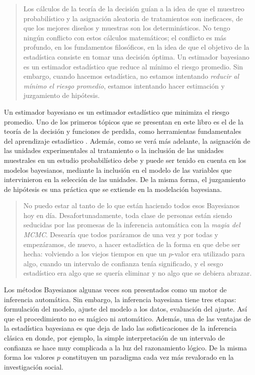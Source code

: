 \documentclass[
  10pt,
  spanish,
]{book}
\theoremstyle{definition}
\theoremstyle{definition}
\theoremstyle{definition}
\theoremstyle{definition}
\theoremstyle{remark}
\begin{document}
\begin{quote}
Los cálculos de la teoría de la decisión guían a la idea de que el muestreo probabilístico y la asignación aleatoria de tratamientos son ineficaces, de que los mejores diseños y muestras son los determinísticos. No tengo ningún conflicto con estos cálculos matemáticos; el conflicto es más profundo, en los fundamentos filosóficos, en la idea de que el objetivo de la estadística consiste en tomar una decisión óptima. Un estimador bayesiano es un estimador estadístico que reduce al mínimo el riesgo promedio. Sin embargo, cuando hacemos estadística, no estamos intentando \emph{reducir al mínimo el riesgo promedio}, estamos intentando hacer estimación y juzgamiento de hipótesis.
\end{quote}

Un estimador bayesiano es un estimador estadístico que minimiza el riesgo promedio. Uno de los primeros tópicos que se presentan en este libro es el de la teoría de la decisión y funciones de perdida, como herramientas fundamentales del aprendizaje estadístico \citep{hastie}. Además, como se verá más adelante, la asignación de las unidades experimentales al tratamiento o la inclusión de las unidades muestrales en un estudio probabilístico debe y puede ser tenido en cuenta en los modelos bayesianos, mediante la inclusión en el modelo de las variables que intervinieron en la selección de las unidades. De la misma forma, el juzgamiento de hipótesis es una práctica que se extiende en la modelación bayesiana.

\begin{quote}
No puedo estar al tanto de lo que están haciendo todos esos Bayesianos hoy en día. Desafortunadamente, toda clase de personas están siendo seducidas por las promesas de la inferencia automática con la \emph{magia del MCMC}. Desearía que todos paráramos de una vez y por todas y empezáramos, de nuevo, a hacer estadística de la forma en que debe ser hecha: volviendo a los viejos tiempos en que un \(p\)-valor era utilizado para algo, cuando un intervalo de confianza tenía significado, y el sesgo estadístico era algo que se quería eliminar y no algo que se debiera abrazar.
\end{quote}

Los métodos Bayesianos algunas veces son presentados como un motor de inferencia automática. Sin embargo, la inferencia bayesiana tiene tres etapas: formulación del modelo, ajuste del modelo a los datos, evaluación del ajuste. Así que el procedimiento no es mágico ni automático. Además, una de las ventajas de la estadística bayesiana es que deja de lado las sofisticaciones de la inferencia clásica en donde, por ejemplo, la simple interpretación de un intervalo de confianza se hace muy complicada a la luz del razonamiento lógico. De la misma forma los valores \(p\) constituyen un paradigma cada vez más revalorado en la investigación social.
\end{document}
